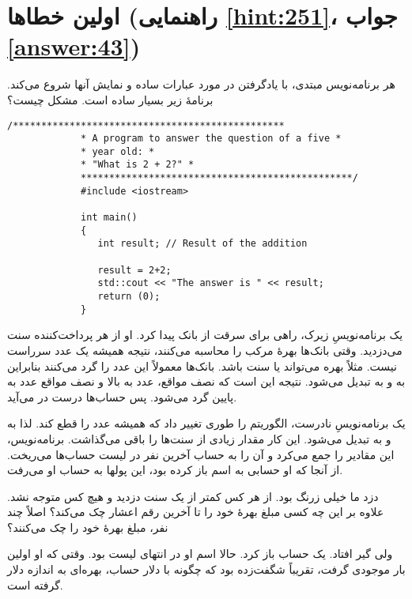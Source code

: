 \section[اولین خطاها]{اولین خطاها \protect{} (راهنمایی \ref{hint:251}، جواب \ref{answer:43})}
هر برنامه‌نویس مبتدی، با یادگرفتن در مورد عبارات ساده و نمایش آنها شروع می‌کند. برنامهٔ زیر بسیار ساده است. مشکل چیست؟

\begin{LTR}
        \begin{lstlisting}[style=C++Style]
             /************************************************
             * A program to answer the question of a five *
             * year old: *
             * "What is 2 + 2?" *
             ************************************************/
             #include <iostream>

             int main()
             {
             	int result; // Result of the addition

             	result = 2+2;
             	std::cout << "The answer is " << result;
             	return (0);
             }
        \end{lstlisting}
\end{LTR}

\begin{tcolorbox}
    یک برنامه‌نویسِ زیرک، راهی برای سرقت از بانک پیدا کرد. او از هر پرداخت‌کننده  سنت می‌دزدید. وقتی بانک‌ها بهرهٔ مرکب را محاسبه می‌کنند، نتیجه همیشه یک عدد سرراست نیست. مثلاً بهره می‌تواند  یا  سنت باشد. بانک‌ها معمولاً این عدد را گرد می‌کنند بنابراین  به  و  به  تبدیل می‌شود. نتیجه این است که نصف مواقع، عدد به بالا و نصف مواقع عدد به پایین گرد می‌شود. پس حساب‌ها درست در می‌آید.

    یک برنامه‌نویسِ نادرست، الگوریتم را طوری تغییر داد که همیشه عدد را قطع کند. لذا  به  و  به  تبدیل می‌شود. این کار مقدار زیادی از سنت‌ها را باقی می‌گذاشت. برنامه‌نویس، این مقادیر را جمع می‌کرد و آن را به حساب آخرین نفر در لیست حساب‌ها می‌ریخت. از آنجا که او حسابی به اسم  باز کرده بود، این پولها به حساب او می‌رفت.

    دزد ما خیلی زرنگ بود. از هر کس کمتر از یک سنت دزدید و هیچ کس متوجه نشد. علاوه بر این چه کسی مبلغ بهرهٔ خود را تا آخرین رقم اعشار چک می‌کند؟ اصلاً چند نفر، مبلغ بهرهٔ خود را چک می‌کنند؟

    ولی گیر افتاد.  یک حساب باز کرد. حالا اسم او در انتهای لیست بود. وقتی که او اولین بار موجودی گرفت، تقریباً شگفت‌زده بود که چگونه با  دلار حساب، بهره‌ای به اندازه  دلار گرفته است.
\end{tcolorbox}